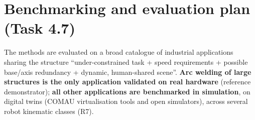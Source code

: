 \section{Benchmarking and evaluation plan (Task 4.7)}\label{sec:bench}

\begin{planbox}
The methods are evaluated on a broad catalogue of industrial applications sharing the structure ``under-constrained task + speed requirements + possible base/axis redundancy + dynamic, human-shared scene''. \textbf{Arc welding of large structures is the only application validated on real hardware} (reference demonstrator); \textbf{all other applications are benchmarked in simulation}, on digital twins (COMAU virtualisation tools and open simulators), across several robot kinematic classes (R7).
\end{planbox}

